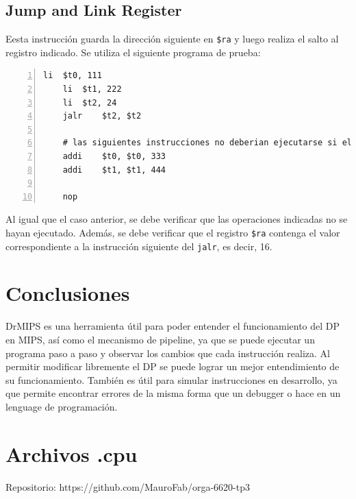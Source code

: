 \documentclass[11pt,a4paper, spanish]{article}
\begin{document}
\subsection{Jump and Link Register}

Eesta instrucción guarda la dirección siguiente en \texttt{\$ra} y luego realiza el salto al registro
indicado. Se utiliza el siguiente programa de prueba:

\begin{lstlisting}[numbers=left, tabsize=2, basicstyle=\fontsize{11}{13}\ttfamily, frame=single, caption={Test jr}]
	li	$t0, 111
	li	$t1, 222
	li	$t2, 24
	jalr	$t2, $t2

	# las siguientes instrucciones no deberian ejecutarse si el salto se realiza
	addi	$t0, $t0, 333
	addi	$t1, $t1, 444

	nop
\end{lstlisting}

Al igual que el caso anterior, se debe verificar que las operaciones indicadas no se hayan ejecutado.
Además, se debe verificar que el registro \texttt{\$ra} contenga el valor correspondiente a la instrucción
siguiente del \texttt{jalr}, es decir, 16.


\section{Conclusiones}

DrMIPS es una herramienta útil para poder entender el funcionamiento del DP en MIPS, así
como el mecanismo de pipeline, ya que se puede ejecutar un programa paso a paso y observar los cambios
que cada instrucción realiza. Al permitir modificar libremente el DP se puede lograr un mejor
entendimiento de su funcionamiento. También es útil para simular instrucciones en 
desarrollo, ya que permite encontrar errores de la misma forma que un debugger o hace
en un lenguage de programación.


\newpage

\section{Archivos .cpu}

Repositorio: https://github.com/MauroFab/orga-6620-tp3
\end{document}

